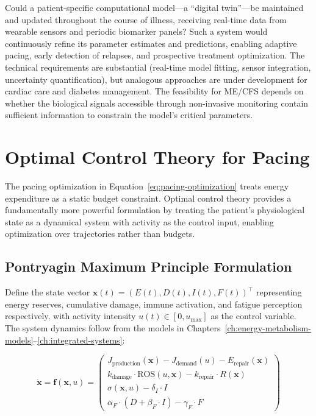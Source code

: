 \begin{open_question}
Could a patient-specific computational model---a ``digital twin''---be maintained and updated throughout the course of illness, receiving real-time data from wearable sensors and periodic biomarker panels? Such a system would continuously refine its parameter estimates and predictions, enabling adaptive pacing, early detection of relapses, and prospective treatment optimization. The technical requirements are substantial (real-time model fitting, sensor integration, uncertainty quantification), but analogous approaches are under development for cardiac care and diabetes management. The feasibility for ME/CFS depends on whether the biological signals accessible through non-invasive monitoring contain sufficient information to constrain the model's critical parameters.
\end{open_question}

\section{Optimal Control Theory for Pacing}
\label{sec:optimal-control-pacing}

The pacing optimization in Equation~\ref{eq:pacing-optimization} treats energy expenditure as a static budget constraint. Optimal control theory provides a fundamentally more powerful formulation by treating the patient's physiological state as a dynamical system with activity as the control input, enabling optimization over trajectories rather than budgets.

\subsection{Pontryagin Maximum Principle Formulation}

Define the state vector $\mathbf{x}(t) = (E(t), D(t), I(t), F(t))^\top$ representing energy reserves, cumulative damage, immune activation, and fatigue perception respectively, with activity intensity $u(t) \in [0, u_{\max}]$ as the control variable. The system dynamics follow from the models in Chapters~\ref{ch:energy-metabolism-models}--\ref{ch:integrated-systems}:

\begin{equation}
\label{eq:state-dynamics-control}
\dot{\mathbf{x}} = \mathbf{f}(\mathbf{x}, u) = \begin{pmatrix}
J_{\text{production}}(\mathbf{x}) - J_{\text{demand}}(u) - E_{\text{repair}}(\mathbf{x}) \\
k_{\text{damage}} \cdot \text{ROS}(u, \mathbf{x}) - k_{\text{repair}} \cdot R(\mathbf{x}) \\
\sigma(\mathbf{x}, u) - \delta_I \cdot I \\
\alpha_F \cdot (D + \beta_F \cdot I) - \gamma_F \cdot F
\end{pmatrix}
\end{equation}

